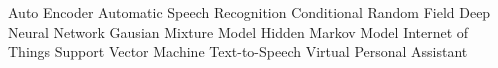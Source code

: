 


  {Auto Encoder}
 {Automatic Speech Recognition}
 {Conditional Random Field}
 {Deep Neural Network}
 {Gausian Mixture Model}
 {Hidden Markov Model}
 {Internet of Things}
 {Support Vector Machine}
 {Text-to-Speech}
 {Virtual Personal Assistant}



